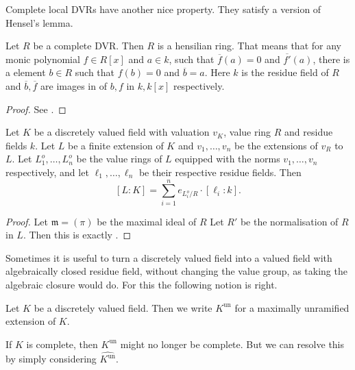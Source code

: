 Complete local DVRs have another nice property. They satisfy a version of Hensel's lemma. 
\begin{lemma}
	Let $R$ be a complete DVR. 
	Then $R$ is a hensilian ring.
	That means that for any monic polynomial $f \in R[x]$ and  $a \in k$, such that $\overline{f}(a) = 0$ and $\overline{f'}(a)$, there is a element $b \in R$ such that $f(b) = 0$ and $\overline{b} = a$.
	Here $k$ is the residue field of $R$ and $\overline{b}, \overline{f}$ are images in of $b, f$ in $k, k[x ]$ respectively. 
\end{lemma}
\begin{proof}
	See .
\end{proof}


\begin{proposition}\label{prop:balancing_valuations}
	Let $K$ be a discretely valued field with valuation $v_K$,  value ring $R$ and residue fields $k$. 
	Let $L$ be a finite extension of $K$ and $v_1, \ldots, v_n$ be the extensions of $v_R$ to $L$. 
	Let $L_1^{o}, \ldots, L_n^{o}$ be the value rings of $L$ equipped with the norms $v_1, \ldots, v_n$ respectively, and let $\ell_1, \ldots, \ell_n$ be their respective residue fields. 
	Then \[
		[L: K] = \sum_{i= 1}^{n} e_{L_i^{o} / R} \cdot [\ell_i: k]
	.\] 
\end{proposition}
\begin{proof}
	Let $\mathfrak{m} = (\pi) $ be the maximal ideal of $R$
	Let $R'$ be the normalisation of $R$ in $L$. 
	Then this is exactly .
\end{proof}

Sometimes it is useful to turn a discretely valued field into a valued field with algebraically closed residue field, without changing the value group, as taking the algebraic closure would do. 
For this the following notion is right. 
\begin{definition}
	Let $K$ be a discretely valued field. 
	Then we write $K^{\text{un}}$ for a maximally unramified extension of $K$. 
\end{definition}
If $K$ is complete, then $K^{\text{un}}$ might no longer be complete. But we can resolve this by simply considering $\hat{K^{\text{un}}}$. 
 
